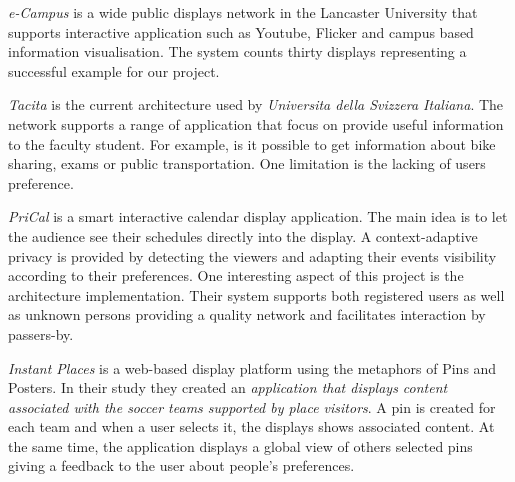 \documentclass[]{usiinfbachelorproject}
\begin{document}
\emph{e-Campus} is a wide  public displays network in the Lancaster University that supports interactive application such as Youtube, Flicker and campus based information visualisation. The system counts thirty displays representing a successful example for our project.

\emph{Tacita} is the current architecture used by \emph{Universita della Svizzera Italiana}. The network supports a range of application that focus on provide useful information to the faculty student. For example, is it possible to get information about bike sharing, exams or public transportation. One limitation is the lacking of users preference.

\emph{PriCal} is a smart interactive calendar display application. The main idea is to let the audience see their schedules directly into the display. A context-adaptive privacy is provided  by detecting the viewers and  adapting their events visibility according to their preferences. One interesting aspect of this project is the  architecture implementation. Their system supports both registered users as well as unknown persons providing a quality network and facilitates interaction by passers-by. 

\emph{Instant Places} is a web-based display platform using the metaphors of Pins and Posters. In their study\cite{pins_and_posters} they created an \emph{application that displays content associated with the soccer teams supported by place visitors}. A pin is created for each team and when a user selects it, the displays shows associated content. At the same time, the application displays a global view of others selected pins giving a feedback to the user about people's preferences.

%
%
%
%
%
%
%
\end{document}
